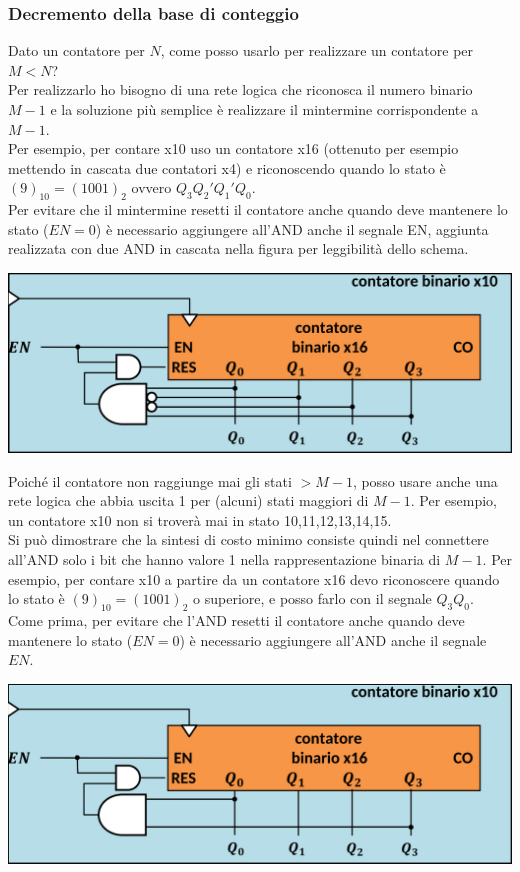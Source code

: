 \documentclass{article}
\begin{document}
\subsubsection{Decremento della base di conteggio}
Dato un contatore per $N$, come posso usarlo per realizzare un contatore per $M<N$?\\
Per realizzarlo ho bisogno di una rete logica che riconosca il numero binario $M-1$ e la soluzione più semplice è realizzare il mintermine corrispondente a $M-1$.\\
Per esempio, per contare x10 uso un contatore x16 (ottenuto per esempio mettendo in cascata due contatori x4) e riconoscendo quando lo stato è $(9)_{10} = (1001)_2$ ovvero $Q_3Q_2'Q_1'Q_0$.\\
Per evitare che il mintermine resetti il contatore anche quando deve mantenere lo stato ($EN=0$) è necessario aggiungere all’AND anche il segnale EN, aggiunta realizzata con due AND in cascata nella figura per leggibilità dello schema.
\begin{center}
    \includegraphics[scale=0.35]{decremento.png}
\end{center}
Poiché il contatore non raggiunge mai gli stati $>M-1$, posso usare anche una rete logica che abbia uscita 1 per (alcuni) stati maggiori di $M-1$. Per esempio, un contatore x10 non si troverà mai in stato 10,11,12,13,14,15.\\
Si può dimostrare che la sintesi di costo minimo consiste quindi nel connettere all’AND solo i bit che hanno valore 1 nella rappresentazione binaria di $M-1$. Per esempio, per contare x10 a partire da un contatore x16 devo riconoscere quando lo stato è $(9)_{10}= (1001)_2$ o superiore, e posso farlo con il segnale $Q_3Q_0$.
Come prima, per evitare che l’AND resetti il contatore anche quando deve mantenere lo stato ($EN=0$) è necessario aggiungere all’AND anche il segnale $EN$.
\begin{center}
    \includegraphics[scale=0.35]{decremento 2.png}
\end{center}
\end{document}
